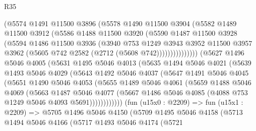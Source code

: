 \begin{lexlean}{R35}
\begin{coremodule}
                  (@5574
                    @1491
                    @11500
                    @3896
                    (@5578
                      @1490
                      @11500
                      @3904
                      (@5582
                        @1489
                        @11500
                        @3912
                        (@5586
                          @1488
                          @11500
                          @3920
                          (@5590
                            @1487
                            @11500
                            @3928
                            (@5594
                              @1486
                              @11500
                              @3936
                              (@3940
                                @753
                                @1249
                                @3943
                                @3952
                                @11500
                                @3957
                                @3962
                                (@5605 @742 @2582 (@2712 (@5608 @742)))))))))))))))
        (@5627
          @1496
          @5046
          @4005
          (@5631
            @1495
            @5046
            @4013
            (@5635
              @1494
              @5046
              @4021
              (@5639
                @1493
                @5046
                @4029
                (@5643
                  @1492
                  @5046
                  @4037
                  (@5647
                    @1491
                    @5046
                    @4045
                    (@5651
                      @1490
                      @5046
                      @4053
                      (@5655
                        @1489
                        @5046
                        @4061
                        (@5659
                          @1488
                          @5046
                          @4069
                          (@5663
                            @1487
                            @5046
                            @4077
                            (@5667 @1486 @5046 @4085 (@4088 @753 @1249 @5046 @4093 @5691))))))))))))
        (fun (u15x0 : @2209) =>
        fun (u15x1 : @2209) =>
        @5705
          @1496
          @5046
          @4150
          (@5709
            @1495
            @5046
            @4158
            (@5713
              @1494
              @5046
              @4166
              (@5717
                @1493
                @5046
                @4174
                (@5721

\end{coremodule}
\end{lexlean}
